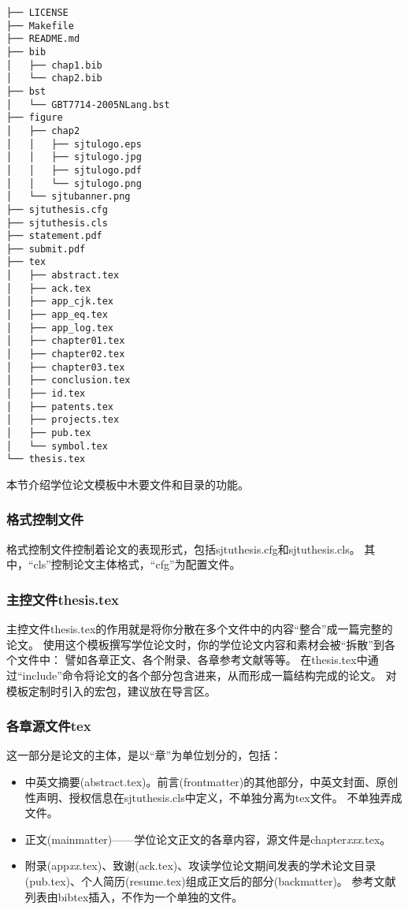 \begin{lstlisting}[basicstyle=\small\ttfamily,caption={模板文件布局},label=layout,float,numbers=none]
├── LICENSE
├── Makefile
├── README.md
├── bib
│   ├── chap1.bib
│   └── chap2.bib
├── bst
│   └── GBT7714-2005NLang.bst
├── figure
│   ├── chap2
│   │   ├── sjtulogo.eps
│   │   ├── sjtulogo.jpg
│   │   ├── sjtulogo.pdf
│   │   └── sjtulogo.png
│   └── sjtubanner.png
├── sjtuthesis.cfg
├── sjtuthesis.cls
├── statement.pdf
├── submit.pdf
├── tex
│   ├── abstract.tex
│   ├── ack.tex
│   ├── app_cjk.tex
│   ├── app_eq.tex
│   ├── app_log.tex
│   ├── chapter01.tex
│   ├── chapter02.tex
│   ├── chapter03.tex
│   ├── conclusion.tex
│   ├── id.tex
│   ├── patents.tex
│   ├── projects.tex
│   ├── pub.tex
│   └── symbol.tex
└── thesis.tex
\end{lstlisting}

本节介绍学位论文模板中木要文件和目录的功能。

\subsubsection{格式控制文件}
\label{sec:format}

格式控制文件控制着论文的表现形式，包括sjtuthesis.cfg和sjtuthesis.cls。
其中，“cls”控制论文主体格式，“cfg”为配置文件。

\subsubsection{主控文件thesis.tex}
\label{sec:thesistex}

主控文件thesis.tex的作用就是将你分散在多个文件中的内容“整合”成一篇完整的论文。
使用这个模板撰写学位论文时，你的学位论文内容和素材会被“拆散”到各个文件中：
譬如各章正文、各个附录、各章参考文献等等。
在thesis.tex中通过“include”命令将论文的各个部分包含进来，从而形成一篇结构完成的论文。
对模板定制时引入的宏包，建议放在导言区。

\subsubsection{各章源文件tex}
\label{sec:thesisbody}

这一部分是论文的主体，是以“章”为单位划分的，包括：

\begin{itemize}[noitemsep,topsep=0pt,parsep=0pt,partopsep=0pt]
	\item 中英文摘要(abstract.tex)。前言(frontmatter)的其他部分，中英文封面、原创性声明、授权信息在sjtuthesis.cls中定义，不单独分离为tex文件。
不单独弄成文件。
	\item 正文(mainmatter)——学位论文正文的各章内容，源文件是chapter\emph{xxx}.tex。
	\item 附录(app\emph{xx}.tex)、致谢(ack.tex)、攻读学位论文期间发表的学术论文目录(pub.tex)、个人简历(resume.tex)组成正文后的部分(backmatter)。\cite{chen2007act}
参考文献列表由bibtex插入，不作为一个单独的文件。
\end{itemize}

